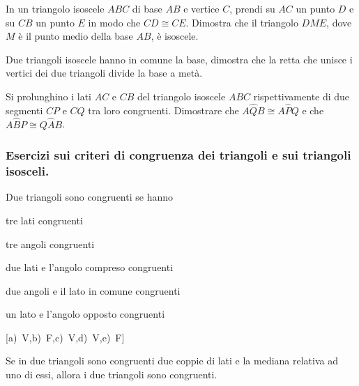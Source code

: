 \begin{multicols}{2}
\begin{esercizio}
In un triangolo isoscele \(ABC\) di base \(AB\) e vertice \(C\), prendi su 
\(AC\) un punto \(D\) e su \(CB\) un punto \(E\) in modo che \(CD\cong CE\). 
Dimostra che il triangolo \(DME\), dove \(M\) è il punto medio della base 
\(AB\), è isoscele.
\end{esercizio}

\begin{esercizio}
Due triangoli isoscele hanno in comune la base, dimostra che la retta 
che unisce i vertici dei due triangoli divide la base a metà.
\end{esercizio}

\begin{esercizio}
Si prolunghino i lati \(AC\) e \(CB\) del triangolo isoscele \(ABC\) 
rispettivamente di due segmenti \(CP\) e \(CQ\) tra loro congruenti. 
Dimostrare che \(A\widehat{Q}B\cong A\widehat{P}Q\) e che 
\(A\widehat{B}P\cong Q\widehat{A}B\).
\end{esercizio}

\subsubsection*{Esercizi sui criteri di congruenza dei triangoli e 
sui triangoli isosceli.}

\begin{esercizio}
Due triangoli sono congruenti se hanno
\begin{enumeratea}
\item tre lati congruenti \hfill\boxV\quad\boxF
\item tre angoli congruenti \hfill\boxV\quad\boxF
\item due lati e l'angolo compreso congruenti\tab\hfill\boxV\quad\boxF
\item due angoli e il lato in comune 
congruenti\tab\hfill\boxV\quad\boxF
\item un lato e l'angolo opposto 
congruenti\tab\tab\hfill\boxV\quad\boxF
\end{enumeratea}
\hfill[a)~V,\quad b)~F,\quad c)~V,\quad d)~V,\quad e)~F]
\end{esercizio}

\begin{esercizio}
Se in due triangoli sono congruenti due coppie di lati e la mediana 
relativa ad uno di essi, allora i due triangoli sono congruenti.
\end{esercizio}


\end{multicols}
